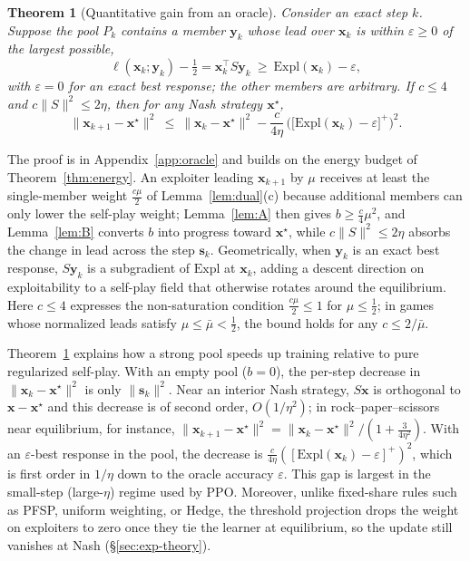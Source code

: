 \documentclass{article}
\theoremstyle{plain}
\newtheorem{theorem}{Theorem}[section]
\theoremstyle{remark}
\newcommand{\Expl}{\mathrm{Expl}}
\newcommand{\bx}{{\bm{x}}}
\newcommand{\by}{{\bm{y}}}
\newcommand{\xs}{\bx^{\star}}
\newcommand{\dx}{{\bm{s}}}
\begin{document}
\begin{theorem}[Quantitative gain from an oracle]
\label{thm:oracle}
Consider an exact step $k$. Suppose the pool $P_k$ contains a member $\by_k$ whose lead over $\bx_k$ is within $\varepsilon\ge0$ of the largest possible,
\[
\ell(\bx_k;\by_k)-\tfrac12=\bx_k^\top S\by_k\ \ge\ \Expl(\bx_k)-\varepsilon ,
\]
with $\varepsilon=0$ for an exact best response; the other members are arbitrary. If $c\le4$ and $c\|S\|^2\le2\eta$, then for any Nash strategy $\xs$,
\[
\|\bx_{k+1}-\xs\|^2\ \le\ \|\bx_k-\xs\|^2-\frac{c}{4\eta}\,\Big(\big[\Expl(\bx_k)-\varepsilon\big]^+\Big)^2 .
\]
\end{theorem}
The proof is in Appendix~\ref{app:oracle} and builds on the energy budget of Theorem~\ref{thm:energy}. An exploiter leading $\bx_{k+1}$ by $\mu$ receives at least the single-member weight $\tfrac{c\mu}2$ of Lemma~\ref{lem:dual}(c) because additional members can only lower the self-play weight; Lemma~\ref{lem:A} then gives $b\ge\tfrac c4\mu^2$, and Lemma~\ref{lem:B} converts $b$ into progress toward $\xs$, while $c\|S\|^2\le2\eta$ absorbs the change in lead across the step $\dx_k$. Geometrically, when $\by_k$ is an exact best response, $S\by_k$ is a subgradient of $\Expl$ at $\bx_k$, adding a descent direction on exploitability to a self-play field that otherwise rotates around the equilibrium. Here $c\le4$ expresses the non-saturation condition $\tfrac{c\mu}2\le1$ for $\mu\le\tfrac12$; in games whose normalized leads satisfy $\mu\le\bar\mu<\tfrac12$, the bound holds for any $c\le2/\bar\mu$.

Theorem~\ref{thm:oracle} explains how a strong pool speeds up training relative to pure regularized self-play. With an empty pool ($b=0$), the per-step decrease in $\|\bx_k-\xs\|^2$ is only $\|\dx_k\|^2$. Near an interior Nash strategy, $S\bx$ is orthogonal to $\bx-\xs$ and this decrease is of second order, $O(1/\eta^2)$; in rock--paper--scissors near equilibrium, for instance, $\|\bx_{k+1}-\xs\|^2=\|\bx_k-\xs\|^2/(1+\tfrac{3}{4\eta^2})$. With an $\varepsilon$-best response in the pool, the decrease is $\tfrac{c}{4\eta}([\Expl(\bx_k)-\varepsilon]^+)^2$, which is first order in $1/\eta$ down to the oracle accuracy $\varepsilon$. This gap is largest in the small-step (large-$\eta$) regime used by PPO. Moreover, unlike fixed-share rules such as PFSP, uniform weighting, or Hedge, the threshold projection drops the weight on exploiters to zero once they tie the learner at equilibrium, so the update still vanishes at Nash (\S\ref{sec:exp-theory}).
\end{document}
